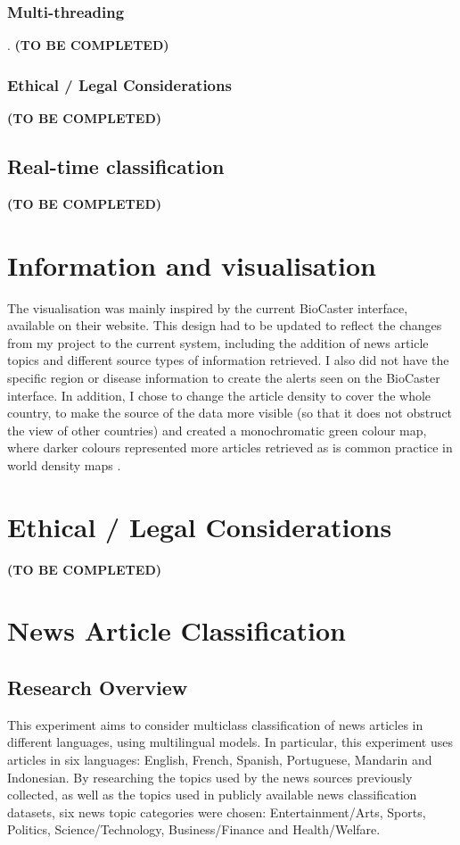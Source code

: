 \documentclass{l4proj}
\begin{document}
\subsubsection{Multi-threading}.
\textbf{(TO BE COMPLETED)}
\subsubsection{Ethical / Legal Considerations}
\textbf{(TO BE COMPLETED)}
\subsection{Real-time classification}
\textbf{(TO BE COMPLETED)}
\section{Information and visualisation}
The visualisation was mainly inspired by the current BioCaster interface, available on their website. This design had to be updated to reflect the changes from my project to the current system, including the addition of news article topics and different source types of information retrieved. I also did not have the specific region or disease information to create the alerts seen on the BioCaster interface. In addition, I chose to change the article density to cover the whole country, to make the source of the data more visible (so that it does not obstruct the view of other countries) and created a monochromatic green colour map, where darker colours represented more articles retrieved as is common practice in world density maps \citep{ourworldindata_density, ons_density}. \par

\section{Ethical / Legal Considerations}
\textbf{(TO BE COMPLETED)}
\section{News Article Classification}
\subsection{Research Overview}
This experiment aims to consider multiclass classification of news articles in different languages, using multilingual models. In particular, this experiment uses articles in six languages: English, French, Spanish, Portuguese, Mandarin and Indonesian. By researching the topics used by the news sources previously collected, as well as the topics used in publicly available news classification datasets, six news topic categories were chosen: Entertainment/Arts, Sports, Politics, Science/Technology, Business/Finance and Health/Welfare. 
\end{document}
